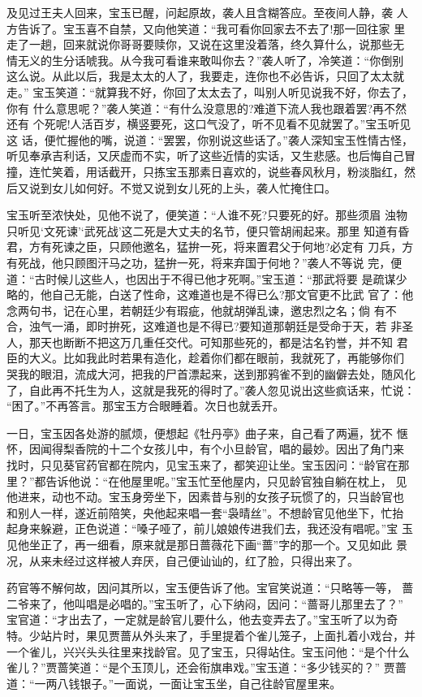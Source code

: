 及见过王夫人回来，宝玉已醒，问起原故，袭人且含糊答应。至夜间人静，袭
人方告诉了。宝玉喜不自禁，又向他笑道：“我可看你回家去不去了!那一回往家
里走了一趟，回来就说你哥哥要赎你，又说在这里没着落，终久算什么，说那些无
情无义的生分话唬我。从今我可看谁来敢叫你去？”袭人听了，冷笑道：“你倒别
这么说。从此以后，我是太太的人了，我要走，连你也不必告诉，只回了太太就走。”
宝玉笑道：“就算我不好，你回了太太去了，叫别人听见说我不好，你去了，你有
什么意思呢？”袭人笑道：“有什么没意思的?难道下流人我也跟着罢?再不然还有
个死呢!人活百岁，横竖要死，这口气没了，听不见看不见就罢了。”宝玉听见这
话，便忙握他的嘴，说道：“罢罢，你别说这些话了。”袭人深知宝玉性情古怪，
听见奉承吉利话，又厌虚而不实，听了这些近情的实话，又生悲感。也后悔自己冒
撞，连忙笑着，用话截开，只拣宝玉那素日喜欢的，说些春风秋月，粉淡脂红，然
后又说到女儿如何好。不觉又说到女儿死的上头，袭人忙掩住口。

宝玉听至浓快处，见他不说了，便笑道：“人谁不死?只要死的好。那些须眉
浊物只听见‘文死谏’‘武死战’这二死是大丈夫的名节，便只管胡闹起来。那里
知道有昏君，方有死谏之臣，只顾他邀名，猛拚一死，将来置君父于何地?必定有
刀兵，方有死战，他只顾图汗马之功，猛拚一死，将来弃国于何地？”袭人不等说
完，便道：“古时候儿这些人，也因出于不得已他才死啊。”宝玉道：“那武将要
是疏谋少略的，他自己无能，白送了性命，这难道也是不得已么?那文官更不比武
官了：他念两句书，记在心里，若朝廷少有瑕疵，他就胡弹乱谏，邀忠烈之名；倘
有不合，浊气一涌，即时拚死，这难道也是不得已?要知道那朝廷是受命于天，若
非圣人，那天也断断不把这万几重任交代。可知那些死的，都是沽名钓誉，并不知
君臣的大义。比如我此时若果有造化，趁着你们都在眼前，我就死了，再能够你们
哭我的眼泪，流成大河，把我的尸首漂起来，送到那鸦雀不到的幽僻去处，随风化
了，自此再不托生为人，这就是我死的得时了。”袭人忽见说出这些疯话来，忙说：
“困了。”不再答言。那宝玉方合眼睡着。次日也就丢开。

一日，宝玉因各处游的腻烦，便想起《牡丹亭》曲子来，自己看了两遍，犹不
惬怀，因闻得梨香院的十二个女孩儿中，有个小旦龄官，唱的最妙。因出了角门来
找时，只见葵官药官都在院内，见宝玉来了，都笑迎让坐。宝玉因问：“龄官在那
里？”都告诉他说：“在他屋里呢。”宝玉忙至他屋内，只见龄官独自躺在枕上，
见他进来，动也不动。宝玉身旁坐下，因素昔与别的女孩子玩惯了的，只当龄官也
和别人一样，遂近前陪笑，央他起来唱一套“袅晴丝”。不想龄官见他坐下，忙抬
起身来躲避，正色说道：“嗓子哑了，前儿娘娘传进我们去，我还没有唱呢。”宝
玉见他坐正了，再一细看，原来就是那日蔷薇花下画“蔷”字的那一个。又见如此
景况，从来未经过这样被人弃厌，自己便讪讪的，红了脸，只得出来了。

药官等不解何故，因问其所以，宝玉便告诉了他。宝官笑说道：“只略等一等，
蔷二爷来了，他叫唱是必唱的。”宝玉听了，心下纳闷，因问：“蔷哥儿那里去了？”
宝官道：“才出去了，一定就是龄官儿要什么，他去变弄去了。”宝玉听了以为奇
特。少站片时，果见贾蔷从外头来了，手里提着个雀儿笼子，上面扎着小戏台，并
一个雀儿，兴兴头头往里来找龄官。见了宝玉，只得站住。宝玉问他：“是个什么
雀儿？”贾蔷笑道：“是个玉顶儿，还会衔旗串戏。”宝玉道：“多少钱买的？”
贾蔷道：“一两八钱银子。”一面说，一面让宝玉坐，自己往龄官屋里来。

